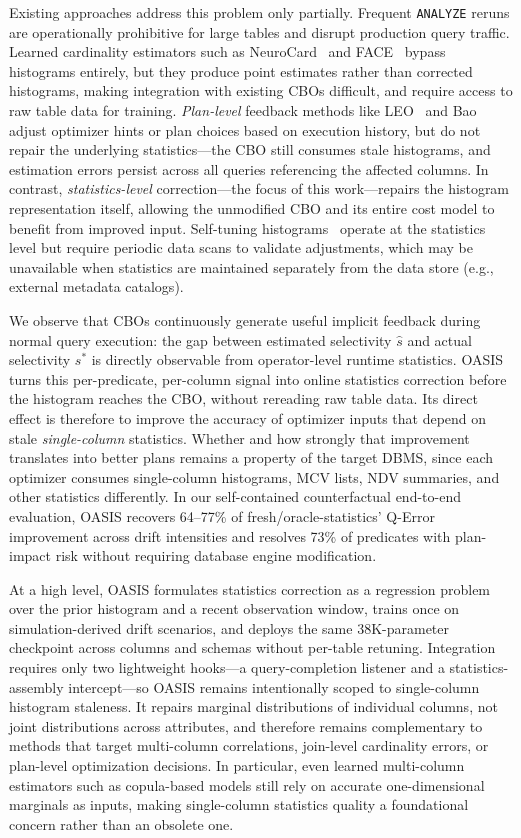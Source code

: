 \documentclass[runningheads]{llncs}
\begin{document}
Existing approaches address this problem only partially.
Frequent \texttt{ANALYZE} reruns are operationally prohibitive for large tables
and disrupt production query traffic.
Learned cardinality estimators such as NeuroCard~\cite{yang2020neurocard}
and FACE~\cite{yang2020face} bypass histograms entirely, but they produce
point estimates rather than corrected histograms, making integration with
existing CBOs difficult, and require access to raw table data for training.
\emph{Plan-level} feedback methods like LEO~\cite{stillger2001leo} and
Bao~\cite{marcus2022bao} adjust optimizer hints or plan choices based on
execution history, but do not repair the underlying statistics---the CBO still
consumes stale histograms, and estimation errors persist across all queries
referencing the affected columns.
In contrast, \emph{statistics-level} correction---the focus of this work---repairs
the histogram representation itself, allowing the unmodified CBO and its entire
cost model to benefit from improved input.
Self-tuning histograms~\cite{aboulnaga1999self} operate at the statistics level
but require periodic data scans to validate adjustments, which may be
unavailable when statistics are maintained separately from the data store
(e.g., external metadata catalogs).

We observe that CBOs continuously generate useful implicit feedback during
normal query execution: the gap between estimated selectivity $\hat{s}$ and
actual selectivity $s^*$ is directly observable from operator-level runtime
statistics. OASIS turns this per-predicate, per-column signal into online
statistics correction before the histogram reaches the CBO, without rereading
raw table data. Its direct effect is therefore to improve the accuracy of
optimizer inputs that depend on stale \emph{single-column} statistics. Whether
and how strongly that improvement translates into better plans remains a
property of the target DBMS, since each optimizer consumes single-column
histograms, MCV lists, NDV summaries, and other statistics differently. In our self-contained counterfactual end-to-end evaluation, OASIS recovers 64--77\% of fresh/oracle-statistics' Q-Error improvement across drift intensities and resolves 73\% of predicates with plan-impact risk without requiring database engine modification.

At a high level, OASIS formulates statistics correction as a regression problem
over the prior histogram and a recent observation window, trains once on
simulation-derived drift scenarios, and deploys the same 38K-parameter
checkpoint across columns and schemas without per-table retuning. Integration requires only two
lightweight hooks---a query-completion listener and a statistics-assembly
intercept---so OASIS remains intentionally scoped to single-column histogram
staleness. It repairs marginal distributions of individual columns, not joint
distributions across attributes, and therefore remains complementary to methods
that target multi-column correlations, join-level cardinality errors, or
plan-level optimization decisions. In particular, even learned multi-column
estimators such as copula-based models still rely on accurate one-dimensional
marginals as inputs, making single-column statistics quality a foundational
concern rather than an obsolete one.
\end{document}
